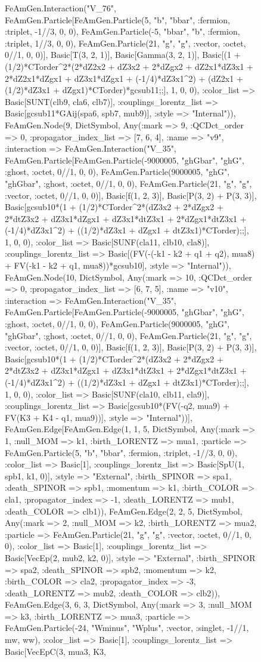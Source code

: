 \documentclass{revtex4}
\begin{document}
\begin{figure}[!htb]
\begin{center}
{FeAmGen.Interaction("V_76", FeAmGen.Particle[FeAmGen.Particle(5, "b", "bbar", :fermion, :triplet, -1//3, 0, 0), FeAmGen.Particle(-5, "bbar", "b", :fermion, :triplet, 1//3, 0, 0), FeAmGen.Particle(21, "g", "g", :vector, :octet, 0//1, 0, 0)], Basic[T(3, 2, 1)], Basic[Gamma(3, 2, 1)], Basic[(1 + (1/2)*CTorder^2*(2*dZ2x2 + dZ3x2 + 2*dZgx2 + dZ2x1*dZ3x1 + 2*dZ2x1*dZgx1 + dZ3x1*dZgx1 + (-1/4)*dZ3x1^2) + (dZ2x1 + (1/2)*dZ3x1 + dZgx1)*CTorder)*gcsub11;;], 1, 0, 0), :color_list => Basic[SUNT(clb9, cla6, clb7)], :couplings_lorentz_list => Basic[gcsub11*GAij(spa6, spb7, mub9)], :style => "Internal")), FeAmGen.Node(9, Dict{Symbol, Any}(:mark => 9, :QCDct_order => 0, :propagator_index_list => [7, 6, 4], :name => "v9", :interaction => FeAmGen.Interaction("V_35", FeAmGen.Particle[FeAmGen.Particle(-9000005, "ghGbar", "ghG", :ghost, :octet, 0//1, 0, 0), FeAmGen.Particle(9000005, "ghG", "ghGbar", :ghost, :octet, 0//1, 0, 0), FeAmGen.Particle(21, "g", "g", :vector, :octet, 0//1, 0, 0)], Basic[f(1, 2, 3)], Basic[P(3, 2) + P(3, 3)], Basic[gcsub10*(1 + (1/2)*CTorder^2*(dZ3x2 + 2*dZgx2 + 2*dtZ3x2 + dZ3x1*dZgx1 + dZ3x1*dtZ3x1 + 2*dZgx1*dtZ3x1 + (-1/4)*dZ3x1^2) + ((1/2)*dZ3x1 + dZgx1 + dtZ3x1)*CTorder);;], 1, 0, 0), :color_list => Basic[SUNF(cla11, clb10, cla8)], :couplings_lorentz_list => Basic[(FV(-(-k1 - k2 + q1 + q2), mua8) + FV(-k1 - k2 + q1, mua8))*gcsub10], :style => "Internal")), FeAmGen.Node(10, Dict{Symbol, Any}(:mark => 10, :QCDct_order => 0, :propagator_index_list => [6, 7, 5], :name => "v10", :interaction => FeAmGen.Interaction("V_35", FeAmGen.Particle[FeAmGen.Particle(-9000005, "ghGbar", "ghG", :ghost, :octet, 0//1, 0, 0), FeAmGen.Particle(9000005, "ghG", "ghGbar", :ghost, :octet, 0//1, 0, 0), FeAmGen.Particle(21, "g", "g", :vector, :octet, 0//1, 0, 0)], Basic[f(1, 2, 3)], Basic[P(3, 2) + P(3, 3)], Basic[gcsub10*(1 + (1/2)*CTorder^2*(dZ3x2 + 2*dZgx2 + 2*dtZ3x2 + dZ3x1*dZgx1 + dZ3x1*dtZ3x1 + 2*dZgx1*dtZ3x1 + (-1/4)*dZ3x1^2) + ((1/2)*dZ3x1 + dZgx1 + dtZ3x1)*CTorder);;], 1, 0, 0), :color_list => Basic[SUNF(cla10, clb11, cla9)], :couplings_lorentz_list => Basic[gcsub10*(FV(-q2, mua9) + FV(K3 + K4 - q1, mua9))], :style => "Internal"))], FeAmGen.Edge[FeAmGen.Edge(1, 1, 5, Dict{Symbol, Any}(:mark => 1, :null_MOM => k1, :birth_LORENTZ => mua1, :particle => FeAmGen.Particle(5, "b", "bbar", :fermion, :triplet, -1//3, 0, 0), :color_list => Basic[1], :couplings_lorentz_list => Basic[SpU(1, spb1, k1, 0)], :style => "External", :birth_SPINOR => spa1, :death_SPINOR => spb1, :momentum => k1, :birth_COLOR => cla1, :propagator_index => -1, :death_LORENTZ => mub1, :death_COLOR => clb1)), FeAmGen.Edge(2, 2, 5, Dict{Symbol, Any}(:mark => 2, :null_MOM => k2, :birth_LORENTZ => mua2, :particle => FeAmGen.Particle(21, "g", "g", :vector, :octet, 0//1, 0, 0), :color_list => Basic[1], :couplings_lorentz_list => Basic[VecEp(2, mub2, k2, 0)], :style => "External", :birth_SPINOR => spa2, :death_SPINOR => spb2, :momentum => k2, :birth_COLOR => cla2, :propagator_index => -3, :death_LORENTZ => mub2, :death_COLOR => clb2)), FeAmGen.Edge(3, 6, 3, Dict{Symbol, Any}(:mark => 3, :null_MOM => k3, :birth_LORENTZ => mua3, :particle => FeAmGen.Particle(-24, "Wminus", "Wplus", :vector, :singlet, -1//1, mw, ww), :color_list => Basic[1], :couplings_lorentz_list => Basic[VecEpC(3, mua3, K3, }
\end{center}
\end{figure}
\end{document}
